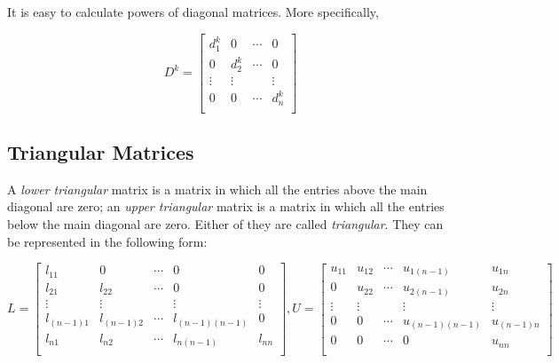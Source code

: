 \documentclass{report}
\begin{document}
		It is easy to calculate powers of diagonal matrices. More specifically,
		
		\begin{displaymath}
		D^{k}=
		\begin{bmatrix}
		d_1^{k} & 0 & \cdots & 0 \\
		0 & d_2^{k} & \cdots & 0 \\
		\vdots & \vdots &        & \vdots \\
		0 & 0 & \cdots & d_n^{k} \\
		\end{bmatrix}
		\end{displaymath}
		
		\subsection{Triangular Matrices}
		A \emph{lower triangular} matrix is a matrix in which all the entries above the main diagonal are zero; an \emph{upper triangular} matrix is a matrix in which all the entries below the main diagonal are zero. Either of they are called \emph{triangular}. They can be represented in the following form:
		
		\begin{displaymath}
		L=
			\begin{bmatrix}
				l_{11}     & 0          & \cdots & 0              & 0      \\
				l_{21}     & l_{22}     & \cdots & 0              & 0      \\
				\vdots     & \vdots     &        & \vdots         & \vdots \\
				l_{(n-1)1} & l_{(n-1)2} & \cdots & l_{(n-1)(n-1)} & 0      \\
				l_{n1}     & l_{n2}     & \cdots & l_{n(n-1)}     & l_{nn} \\
			\end{bmatrix}
		, U=
			\begin{bmatrix}
				u_{11} & u_{12} & \cdots & u_{1(n-1)}     & u_{1n}     \\
				0      & u_{22} & \cdots & u_{2(n-1)}     & u_{2n}     \\
				\vdots & \vdots &        & \vdots         & \vdots     \\
				0      & 0      & \cdots & u_{(n-1)(n-1)} & u_{(n-1)n} \\
				0      & 0      & \cdots & 0              & u_{nn}     \\
			\end{bmatrix}
		\end{displaymath}
		
\end{document}
